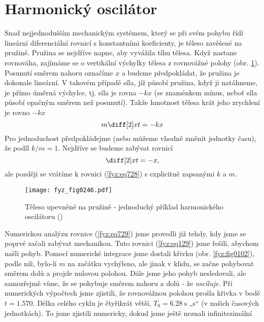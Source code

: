   \section{Harmonický oscilátor}\label{fyz:IchapXXIsecII}
    Snad nejjednodušším mechanickým systémem, který se při svém pohybu řídí lineární diferenciální
    rovnicí s konstantními koeficienty, je těleso zavěšené na pružině. Pružina se nejdříve napne,
    aby vyvážila tíhu tělesa. Když nastane rovnováha, zajímáme se o vertikální výchylky tělesa z
    rovnovážné polohy (obr. \ref{fyz:fig0246}). Posunutí směrem nahoru označíme \(x\) a budeme
    předpokládat, že pružina je dokonale lineární. V takovém případě síla, jíž působí pružina, když
    ji natáhneme, je přímo úměrná výchylce, tj. síla je rovna \(-kx\) (se znaménkem mínus, neboť
    síla působí opačným směrem než posunutí). Takže hmotnost tělesa krát jeho zrychlení je rovno
    \(-kx\)
    \begin{equation}\label{fyz:eq728}
      m\diff[2]xt = -kx
    \end{equation}
    Pro jednoduchost předpokládejme (nebo můžeme vhodně změnit jednotky času), že podíl
    \(k/m =1\). Nejdříve se budeme zabývat rovnicí
    \begin{equation}\label{fyz:eq729}
      \diff[2]xt = -x,
    \end{equation}
    ale později se vrátíme k rovnici (\ref{fyz:eq728}) s explicitně zapsanými \(k\) a \(m\).
    \begin{figure}[ht!] %
      \centering
      \texttt{[image: fyz\_fig0246.pdf]}
      \caption{Těleso upevněné na pružině - jednoduchý příklad harmonického oscilátoru
               (\cite[s.~287]{Feynman01})}
      \label{fyz:fig0246}
    \end{figure}
    Numerickou analýzu rovnice (\ref{fyz:eq729}) jsme provedli již tehdy, kdy jsme se poprvé začali
    zabývat mechanikou. Tuto rovnici (\ref{fyz:eq129}) jsme řešili, abychom našli pohyb. Pomocí
    numerické integrace jsme dostali křivku (obr. \ref{fyz:fig0102}), podle níž, bylo-li \(m\) na
    začátku vychýleno, ale jinak v klidu, se začne pohybovat směrem dolů a projde nulovou polohou.
    Dále jsme jeho pohyb nesledovali, ale samozřejmě víme, že se pohybuje směrem nahoru a dolů - že
    \emph{osciluje}. Při numerických výpočtech jsme zjistili, že rovnovážnou polohou prošla křivka v
    bodě \(t= \num{1.570}\). Délka celého cyklu je čtyřikrát větší, \(T_0 =\SI{6.28}{\s}\) „s“ (v
    našich časových jednotkách). To jsme zjistili numericky, dokud jsme ještě neznali inﬁnitezimální
